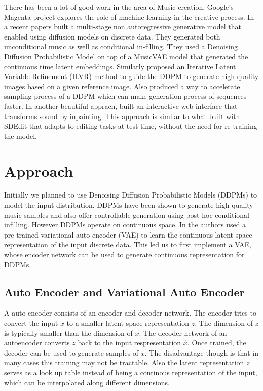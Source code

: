 \documentclass{article}
\begin{document}
There has been a lot of good work in the area of Music creation. Google's Magenta project explores the role of machine learning in the creative process. In a recent papers \citep{mittal} built a multi-stage non autoregressive generative model that enabled using diffusion models on discrete data. They generated both unconditional music as well as conditional in-filling. They used a Denoising Diffusion Probabilistic Model \cite{ho2020denoising} on top of a MusicVAE model that generated the continuous time latent embeddings. Similarly \cite{choi2021ilvr} proposed an Iterative Latent Variable Refinement (ILVR) method to guide the DDPM to generate high quality images based on a given reference image. Also \cite{song2020denoising}  produced a way to accelerate sampling process of a DDPM which can make generation process of sequences faster. In another beautiful apprach, \cite{bazin2021} built an interactive web interface that transforms sound by inpainting. This approach is similar to what \cite{meng2021sdedit} built with SDEdit that adapts to editing tasks at test time, without the need for re-training the model.

\section{Approach}

Initially we planned to use Denoising Diffusion Probabilistic Models (DDPMs) to model the input distribution. DDPMs have been shown to generate high quality music samples \cite{mittal} and also offer controllable generation using post-hoc conditional infilling. However DDPMs operate on continuous space. In \cite{mittal} the authors used a pre-trained variational auto-encoder (VAE) to learn the continuous latent space representation of the input discrete data. This led us to first implement a VAE, whose encoder network can be used to generate continuous representation for DDPMs.

\subsection{Auto Encoder and Variational Auto Encoder}

A auto encoder consists of an encoder and decoder network. The encoder tries to convert the input $x$ to a smaller latent space representation $z$. The dimension of $z$ is typically smaller than the dimension of $x$. The decoder network of an autoencoder converts $z$ back to the input respresentation $\hat{x}$. Once trained, the decoder can be used to generate samples of $x$. The disadvantage though is that in many cases this training may not be tractable. Also the latent representation $z$ serves as a look up table instead of being a continous representation of the input, which can be interpolated along different dimensions.
\end{document}
